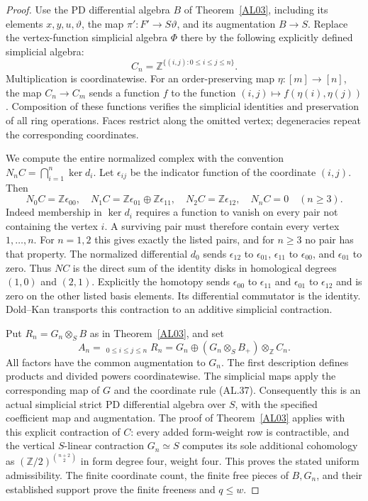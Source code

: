 \begin{proof}
Use the PD differential algebra $B$ of
Theorem~\ref{AL03}, including its elements $x,y,u,\vartheta$,
the map $\pi':F'\to S\vartheta$, and its augmentation
$B\to S$.
Replace the vertex-function simplicial algebra $\Phi$
there by the following explicitly defined simplicial
algebra:
\[
 C_n=\mathbb Z^{\{(i,j):0\leq i\leq j\leq n\}}.
 \tag{AL.37}
\]
Multiplication is coordinatewise.  For an order-preserving
map $\eta:[m]\to[n]$, the map $C_n\to C_m$ sends a
function $f$ to the function
$(i,j)\mapsto f(\eta(i),\eta(j))$.
Composition of these functions verifies the simplicial
identities and preservation of all ring operations.
Faces restrict along the omitted vertex; degeneracies
repeat the corresponding coordinates.

We compute the entire normalized complex with the
convention $N_nC=\bigcap_{i=1}^n\ker d_i$.
Let $\epsilon_{ij}$ be the indicator function of the
coordinate $(i,j)$.  Then
\[
 N_0C=\mathbb Z\epsilon_{00},\quad
 N_1C=\mathbb Z\epsilon_{01}\oplus\mathbb Z\epsilon_{11},
 \quad N_2C=\mathbb Z\epsilon_{12},\quad
 N_nC=0\quad(n\geq3).
 \tag{AL.38}
\]
Indeed membership in $\ker d_i$ requires a function to
vanish on every pair not containing the vertex $i$.
A surviving pair must therefore contain every vertex
$1,\ldots,n$.  For $n=1,2$ this gives exactly the listed
pairs, and for $n\geq3$ no pair has that property.
The normalized differential $d_0$ sends
$\epsilon_{12}$ to $\epsilon_{01}$,
$\epsilon_{11}$ to $\epsilon_{00}$, and
$\epsilon_{01}$ to zero.  Thus $NC$ is the direct sum
of the identity disks in homological degrees $(1,0)$
and $(2,1)$.  Explicitly the homotopy sends
$\epsilon_{00}$ to $\epsilon_{11}$ and
$\epsilon_{01}$ to $\epsilon_{12}$ and is zero on the
other listed basis elements.  Its differential
commutator is the identity.  Dold--Kan transports
this contraction to an additive simplicial contraction.

Put $R_n=G_n\otimes_SB$ as in Theorem~\ref{AL03}, and set
\[
 A_n=\mathop{\prod\nolimits_{G_n}}_{0\leq i\leq j\leq n}R_n
      =G_n\oplus(G_n\otimes_SB_+)\otimes_{\mathbb Z}C_n .
 \tag{AL.39}
\]
All factors have the common augmentation to $G_n$.
The first description defines products and divided
powers coordinatewise.  The simplicial maps apply
the corresponding map of $G$ and the coordinate
rule \textup{(AL.37)}.
Consequently this is an actual simplicial strict PD
differential algebra over $S$, with the specified
coefficient map and augmentation.
The proof of Theorem~\ref{AL03} applies with this
explicit contraction of $C$: every added form-weight
row is contractible, and the vertical $S$-linear
contraction $G_n\simeq S$ computes its sole additional
cohomology as
$(\mathbb Z/2)^{\binom{n+2}{2}}$ in form degree four,
weight four.  This proves the stated uniform
admissibility.  The finite coordinate count, the
finite free pieces of $B,G_n$, and their established
support prove the finite freeness and $q\leq w$.


\end{proof}
